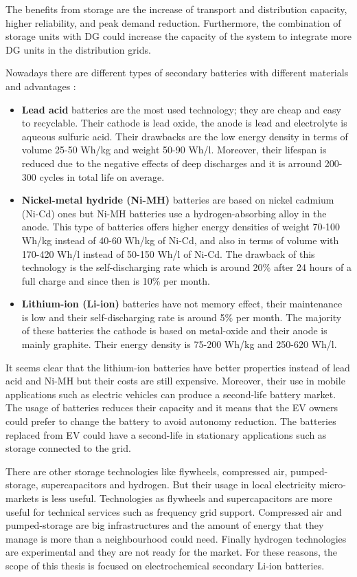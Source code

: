 \documentclass[a4paper,11pt,twoside,openright]{report}
\begin{document}
The benefits from storage are the increase of transport and distribution capacity, higher reliability, and peak demand reduction. Furthermore, the combination of storage units with DG could increase the capacity of the system to integrate more DG units in the distribution grids.

Nowadays there are different types of secondary batteries with different materials and advantages \cite{JoanMarc}:
\begin{itemize}
	\item \textbf{Lead acid} batteries are the most used technology; they are cheap and easy to recyclable. Their cathode is lead oxide, the anode is lead and electrolyte is aqueous sulfuric acid. Their drawbacks are the low energy density in terms of volume 25-50 Wh/kg and weight 50-90 Wh/l. Moreover, their lifespan is reduced due to the negative effects of deep discharges and it is arround 200-300 cycles in total life on average.
	\item \textbf{Nickel-metal hydride (Ni-MH)} batteries are based on nickel cadmium (Ni-Cd) ones but Ni-MH batteries use a hydrogen-absorbing alloy in the anode. This type of batteries offers higher energy densities of weight 70-100 Wh/kg instead of 40-60 Wh/kg of Ni-Cd, and also in terms of volume with 170-420 Wh/l instead of 50-150 Wh/l of Ni-Cd. The drawback of this technology is the self-discharging rate which is around 20$\%$ after 24 hours of a full charge and since then is 10$\%$ per month.
	\item \textbf{Lithium-ion (Li-ion)} batteries have not memory effect, their maintenance is low and their self-discharging rate is around 5$\%$ per month. The majority of these batteries the cathode is based on metal-oxide and their anode is mainly graphite. Their energy density is 75-200 Wh/kg and 250-620 Wh/l.
\end{itemize}

It seems clear that the lithium-ion batteries have better properties instead of lead acid and Ni-MH but their costs are still expensive. Moreover, their use in mobile applications such as electric vehicles can produce a second-life battery market. The usage of batteries reduces their capacity and it means that the EV owners could prefer to change the battery to avoid autonomy reduction. The batteries replaced from EV could have a second-life in stationary applications such as storage connected to the grid.

There are other storage technologies like flywheels, compressed air, pumped-storage, supercapacitors and hydrogen. But their usage in local electricity micro-markets is less useful. 
Technologies as flywheels and supercapacitors are more useful for technical services such as frequency grid support. 
Compressed air and pumped-storage are big infrastructures and the amount of energy that they manage is more than a neighbourhood could need. 
Finally hydrogen technologies are experimental and they are not ready for the market. For these reasons, the scope of this thesis is focused on electrochemical secondary Li-ion batteries.
\end{document}
